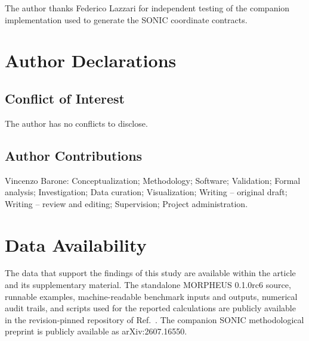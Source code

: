 \documentclass[aip,jcp,reprint,longbibliography,floatfix]{revtex4-2}
\begin{document}
\begin{acknowledgments}
The author thanks Federico Lazzari for independent testing of the companion
implementation used to generate the SONIC coordinate contracts.
\end{acknowledgments}

\section*{Author Declarations}

\subsection*{Conflict of Interest}
The author has no conflicts to disclose.

\subsection*{Author Contributions}
Vincenzo Barone: Conceptualization; Methodology; Software; Validation; Formal
analysis; Investigation; Data curation; Visualization; Writing -- original
draft; Writing -- review and editing; Supervision; Project administration.

\section*{Data Availability}

The data that support the findings of this study are available within the
article and its supplementary material. The standalone MORPHEUS 0.1.0rc6
source, runnable examples, machine-readable benchmark inputs and outputs,
numerical audit trails, and scripts used for the reported calculations are
publicly available in the revision-pinned repository of Ref.~.
The companion SONIC methodological preprint is publicly available as
arXiv:2607.16550.\cite{Barone2026SONIC}




\end{document}
